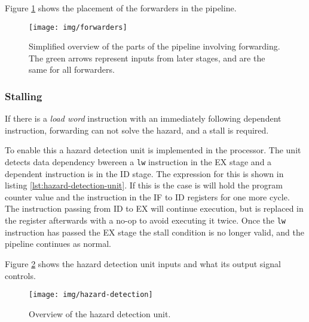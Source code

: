 Figure \ref{fig:forwarders} shows the placement of the forwarders in the pipeline.

\begin{figure}[h]
    \centering
    \texttt{[image: img/forwarders]}
    \caption{Simplified overview of the parts of the pipeline involving forwarding. The green arrows represent inputs from later stages, and are the same for all forwarders.}
    \label{fig:forwarders}
\end{figure}

\subsubsection{Stalling}
\label{sec:hazard-detection}
If there is a \textit{load word} instruction with an immediately following dependent instruction,
forwarding can not solve the hazard, and a stall is required.

To enable this a hazard detection unit is implemented in the processor.
The unit detects data dependency bwereen a \texttt{lw} instruction in the EX stage and a dependent instruction is in the ID stage.
The expression for this is shown in listing \ref{lst:hazard-detection-unit}.
If this is the case is will hold the program counter value and the instruction in the IF to ID registers for one more cycle.
The instruction passing from ID to EX will continue execution,
but is replaced in the register afterwards with a no-op to avoid executing it twice.
Once the \texttt{lw} instruction has passed the EX stage the stall condition is no longer valid,
and the pipeline continues as normal.

Figure \ref{fig:hazard-detection} shows the hazard detection unit inputs and what its output signal controls.

\begin{figure}[h]
    \centering
    \texttt{[image: img/hazard-detection]}
    \caption{
      Overview of the hazard detection unit.
    }
    \label{fig:hazard-detection}
\end{figure}


